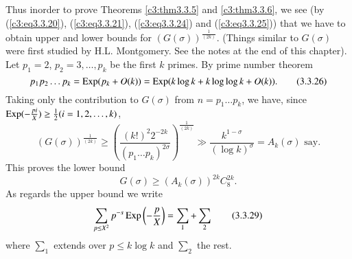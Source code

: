 Thus in\pageoriginale order to prove Theorems \ref{c3:thm3.3.5} and \ref{c3:thm3.3.6}, we see (by (\ref{c3:eq3.3.20}), (\ref{c3:eq3.3.21}), (\ref{c3:eq3.3.24}) and (\ref{c3:eq3.3.25})) that we have to obtain upper and lower bounds  for $(G(\sigma))^{\frac{1}{(2k)}}$. (Things similar to $G(\sigma)$ were first studied by H.L. Montgomery. See the notes at the end of this chapter). Let $p_1 = 2$, $p_2 =3, \ldots, p_k$ be the first $k$ primes. By prime number theorem
\begin{equation*}
p_1 p_2 \ldots p_k = \operatorname{Exp} (p_k + O(k)) = \operatorname{Exp} (k \log k + k \log \log k + O(k)). 
\tag{3.3.26}\label{c3:eq3.3.26}
\end{equation*}
Taking only the contribution to $G(\sigma)$ from $n = p_1 \ldots p_k$, we have, since $\operatorname{Exp} (-\frac{pi}{X}) \geq  \frac{1}{2} (i = 1,2,\ldots, k)$,
\begin{equation*}
(G(\sigma))^{\frac{1}{(2k)}} \geq \left(\frac{(k!)^2 2^{-2k}}{(p_1 \ldots p_k)^{2\sigma}} \right)^{\frac{1}{(2k)}} \gg \frac{k^{1-\sigma}}{(\log k)^{\sigma}} = A_k (\sigma) \text{ say}. 
\tag{3.3.27}\label{c3:eq3.3.27}
\end{equation*}
This proves the lower bound
\begin{equation*}
G(\sigma) \geq (A_k (\sigma))^{2k} C^{2k}_8. \tag{3.3.28}\label{c3:eq3.3.28}
\end{equation*}
As regards the upper bound we write
\begin{equation*}
\sum\limits_{p \leq X^2} p^{-s} \operatorname{Exp} \left(-\frac{p}{X} \right) = \sum\limits_1  + \sum\limits_2 \tag{3.3.29}\label{c3:eq3.3.29}
\end{equation*}
where $\sum_1$ extends over $p\leq k \log k$ and $\sum_2$ the rest. 

